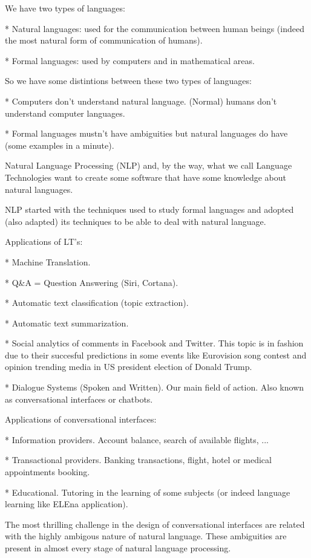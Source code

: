 \documentclass[a4paper,10pt]{article}
\begin{document}
We have two types of languages:

* Natural languages: used for the communication between human beings (indeed the most natural form of communication of humans).

* Formal languages: used by computers and in mathematical areas.

So we have some distintions between these two types of languages:

* Computers don't understand natural language. (Normal) humans don't understand computer languages.

* Formal languages mustn't have ambiguities but natural languages do have (some examples in a minute).

Natural Language Processing (NLP) and, by the way, what we call Language Technologies want to create some software that have some knowledge about natural languages.

NLP started with the techniques used to study formal languages and adopted (also adapted) its techniques to be able to deal with natural language.

Applications of LT's:

* Machine Translation.

* Q\&A = Question Answering (Siri, Cortana).

* Automatic text classification (topic extraction).

* Automatic text summarization.

* Social analytics of comments in Facebook and Twitter. This topic is in fashion due to their succesful predictions in some events like Eurovision song contest and 
opinion trending media in US president election of Donald Trump.

* Dialogue Systems (Spoken and Written). Our main field of action. Also known as conversational interfaces or chatbots.

Applications of conversational interfaces:

* Information providers. Account balance, search of available flights, ...

* Transactional providers. Banking transactions, flight, hotel or medical appointments booking.

* Educational. Tutoring in the learning of some subjects (or indeed language learning like ELEna application).



The most thrilling challenge in the design of conversational interfaces are related with the highly ambigous nature of natural language. These ambiguities are present in almost every stage of natural language processing.
\end{document}
